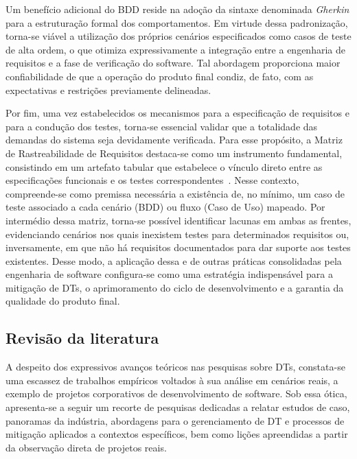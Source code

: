 


Um benefício adicional do BDD reside na adoção da sintaxe denominada \textit{Gherkin} para a estruturação formal dos comportamentos. Em virtude dessa padronização, torna-se viável a utilização dos próprios cenários especificados como casos de teste de alta ordem, o que otimiza expressivamente a integração entre a engenharia de requisitos e a fase de verificação do software. Tal abordagem proporciona maior confiabilidade de que a operação do produto final condiz, de fato, com as expectativas e restrições previamente delineadas.



Por fim, uma vez estabelecidos os mecanismos para a especificação de requisitos e para a condução dos testes, torna-se essencial validar que a totalidade das demandas do sistema seja devidamente verificada. Para esse propósito, a Matriz de Rastreabilidade de Requisitos destaca-se como um instrumento fundamental, consistindo em um artefato tabular que estabelece o vínculo direto entre as especificações funcionais e os testes correspondentes~\cite{29}. Nesse contexto, compreende-se como premissa necessária a existência de, no mínimo, um caso de teste associado a cada cenário (BDD) ou fluxo (Caso de Uso) mapeado. Por intermédio dessa matriz, torna-se possível identificar lacunas em ambas as frentes, evidenciando cenários nos quais inexistem testes para determinados requisitos ou, inversamente, em que não há requisitos documentados para dar suporte aos testes existentes. Desse modo, a aplicação dessa e de outras práticas consolidadas pela engenharia de software configura-se como uma estratégia indispensável para a mitigação de DTs, o aprimoramento do ciclo de desenvolvimento e a garantia da qualidade do produto final.

\subsection{Revisão da literatura}
\label{sec:revisao_literatura}

A despeito dos expressivos avanços teóricos nas pesquisas sobre DTs, constata-se uma escassez de trabalhos empíricos voltados à sua análise em cenários reais, a exemplo de projetos corporativos de desenvolvimento de software. Sob essa ótica, apresenta-se a seguir um recorte de pesquisas dedicadas a relatar estudos de caso, panoramas da indústria, abordagens para o gerenciamento de DT e processos de mitigação aplicados a contextos específicos, bem como lições apreendidas a partir da observação direta de projetos reais.

